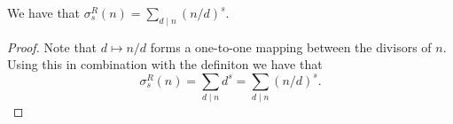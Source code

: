 \begin{theorem}
\label{sigmaR_eq_sum_div}
\leanok
We have that $\sigma^R_s(n)=\sum_{d\mid n}(n/d)^s$.
\end{theorem}
\begin{proof}
\leanok
Note that $d \mapsto n/d$ forms a one-to-one mapping between the divisors of $n$. Using this in
    combination with the definiton we have that
    $$\sigma^R_s(n)=\sum_{d\mid n}d^s=\sum_{d\mid n}(n/d)^s.$$
\end{proof}
